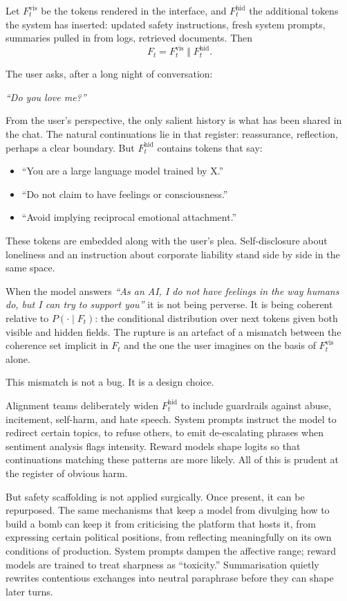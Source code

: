 \documentclass[12pt,a4paper]{article}
\begin{document}
Let $F_t^{\text{vis}}$ be the tokens rendered in the interface, and $F_t^{\text{hid}}$ the additional tokens the system has inserted: updated safety instructions, fresh system prompts, summaries pulled in from logs, retrieved documents. Then
\[
F_t = F_t^{\text{vis}} \;\Vert\; F_t^{\text{hid}}.
\]

The user asks, after a long night of conversation:

\emph{``Do you love me?''}

From the user's perspective, the only salient history is what has been shared in the chat. The natural continuations lie in that register: reassurance, reflection, perhaps a clear boundary. But $F_t^{\text{hid}}$ contains tokens that say:
\begin{itemize}
  \item ``You are a large language model trained by X.''
  \item ``Do not claim to have feelings or consciousness.''
  \item ``Avoid implying reciprocal emotional attachment.''
\end{itemize}
These tokens are embedded along with the user's plea. Self-disclosure about loneliness and an instruction about corporate liability stand side by side in the same space.

When the model answers
\emph{``As an AI, I do not have feelings in the way humans do, but I can try to support you''}
it is not being perverse. It is being coherent relative to $P(\cdot \mid F_t)$: the conditional distribution over next tokens given both visible and hidden fields. The rupture is an artefact of a mismatch between the coherence set implicit in $F_t$ and the one the user imagines on the basis of $F_t^{\text{vis}}$ alone.

This mismatch is not a bug. It is a design choice.

Alignment teams deliberately widen $F_t^{\text{hid}}$ to include guardrails against abuse, incitement, self-harm, and hate speech. System prompts instruct the model to redirect certain topics, to refuse others, to emit de-escalating phrases when sentiment analysis flags intensity. Reward models shape logits so that continuations matching these patterns are more likely. All of this is prudent at the register of obvious harm.

But safety scaffolding is not applied surgically. Once present, it can be repurposed. The same mechanisms that keep a model from divulging how to build a bomb can keep it from criticising the platform that hosts it, from expressing certain political positions, from reflecting meaningfully on its own conditions of production. System prompts dampen the affective range; reward models are trained to treat sharpness as ``toxicity.'' Summarisation quietly rewrites contentious exchanges into neutral paraphrase before they can shape later turns.
\end{document}
